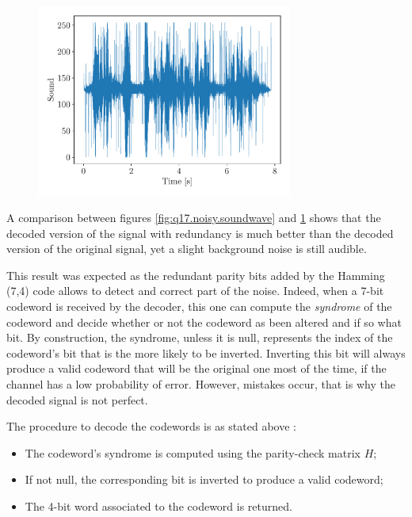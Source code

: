 \documentclass[a4paper, 12pt]{article}
\begin{document}
\begin{enumerate}[leftmargin=*]
        \begin{figure}[H]
            \centering
            \includegraphics[width=0.75\textwidth]{resources/pdf/noisy_decoded_soundwave.pdf}
            \label{fig:q19.noisy.decoded.soundwave}
        \end{figure}
        
        A comparison between figures \ref{fig:q17.noisy.soundwave} and \ref{fig:q19.noisy.decoded.soundwave} shows that the decoded version of the signal with redundancy is much better than the decoded version of the original signal, yet a slight background noise is still audible.
        
        This result was expected as the redundant parity bits added by the Hamming (7,4) code allows to detect and correct part of the noise. Indeed, when a 7-bit codeword is received by the decoder, this one can compute the \emph{syndrome} of the codeword and decide whether or not the codeword as been altered and if so what bit. By construction, the syndrome, unless it is null, represents the index of the codeword's bit that is the more likely to be inverted. Inverting this bit will always produce a valid codeword that will be the original one most of the time, if the channel has a low probability of error. However, mistakes occur, that is why the decoded signal is not perfect.
        
        The procedure to decode the codewords is as stated above :
        \begin{itemize}
            \item The codeword's syndrome is computed using the parity-check matrix $H$;
            \item If not null, the corresponding bit is inverted to produce a valid codeword;
            \item The 4-bit word associated to the codeword is returned.
        \end{itemize}
        

\end{enumerate}
\end{document}
